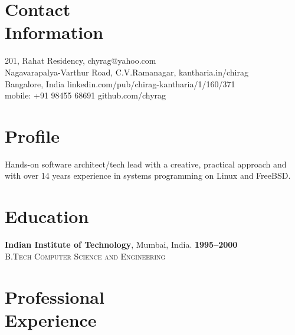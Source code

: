 \documentclass[margin,line]{resume}
\begin{document}
\begin{resume}

    \section{\mysidestyle Contact\\Information}

    201, Rahat Residency,  \hfill chyrag@yahoo.com \\
    Nagavarapalya-Varthur Road, C.V.Ramanagar, \hfill kantharia.in/chirag \\
    Bangalore, India  \hfill linkedin.com/pub/chirag-kantharia/1/160/371 \\
    mobile: +91 98455 68691  \hfill github.com/chyrag \\

    \section{\mysidestyle Profile}

    Hands-on software architect/tech lead with a creative, practical
    approach and with over 14 years experience in systems programming
    on Linux and FreeBSD.

    \section{\mysidestyle Education}
	\textbf{Indian Institute of Technology}, Mumbai, India. \hfill \textbf{1995--2000}\\
	\textsc{B.Tech Computer Science and Engineering} \\

    \section{\mysidestyle Professional\\Experience}


\end{resume}
\end{document}
